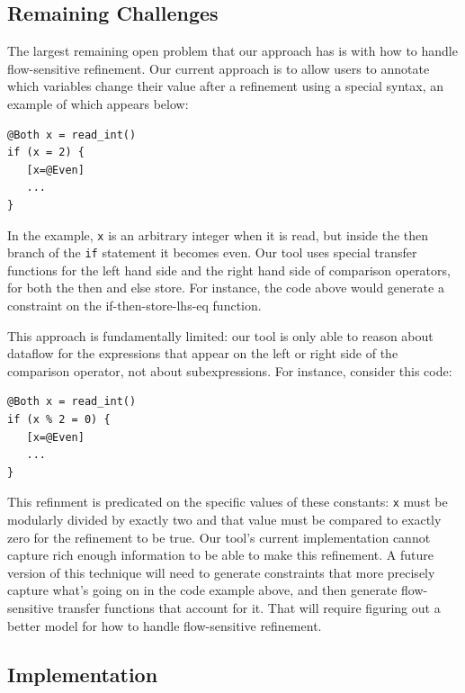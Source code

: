 \documentclass[10pt,conference]{IEEEtran}
\begin{document}
\subsection{Remaining Challenges}

The largest remaining open problem that our approach has is with how to
handle flow-sensitive refinement. Our current approach is to allow
users to annotate which variables change their value after a refinement
using a special syntax, an example of which appears below:

\begin{lstlisting}
@Both x = read_int()
if (x = 2) {
   [x=@Even]
   ...
}
\end{lstlisting}

In the example, \lstinline{x} is an arbitrary integer when it is read, but
inside the then branch of the \lstinline{if} statement it becomes even.
Our tool uses special transfer functions for the left hand side and the
right hand side of comparison operators, for both the then and else store.
For instance, the code above would generate a constraint on the
if-then-store-lhs-eq function.

This approach is fundamentally limited: our tool is only able to reason
about dataflow for the expressions that appear on the left or right side
of the comparison operator, not about subexpressions. For instance,
consider this code:

\begin{lstlisting}
@Both x = read_int()
if (x % 2 = 0) {
   [x=@Even]
   ...
}
\end{lstlisting}

This refinment is predicated on the specific values of these constants:
\lstinline{x} must be modularly divided by exactly two and that value must be
compared to exactly zero for the refinement to be true. Our tool's
current implementation cannot capture rich enough information to be
able to make this refinement. A future version of this technique will need
to generate constraints that more precisely capture what's going on in the
code example above, and then generate flow-sensitive transfer
functions that account for it. That will require figuring out a better
model for how to handle flow-sensitive refinement.

\subsection{Implementation}
\end{document}
